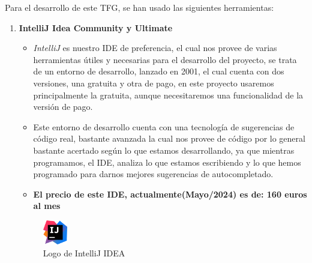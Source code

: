 \documentclass[a4paper]{article}
\begin{document}
Para el desarrollo de este TFG, se han usado las siguientes herramientas:
\begin{enumerate}
    \item \textbf{IntelliJ Idea Community y Ultimate}
          \begin{itemize}
              \item \textit{IntelliJ} es nuestro IDE de preferencia, el cual nos provee de varias herramientas útiles y necesarias para el desarrollo del proyecto, se trata de un entorno de desarrollo, lanzado en 2001, el cual cuenta con dos versiones, una gratuita y otra de pago, en este proyecto usaremos principalmente la gratuita, aunque necesitaremos una funcionalidad de la versión de pago.
              \item Este entorno de desarrollo cuenta con una tecnología de sugerencias de código real, bastante avanzada la cual nos provee de código por lo general bastante acertado según lo que estamos desarrollando, ya que mientras programamos, el IDE, analiza lo que estamos escribiendo y lo que hemos programado para darnos mejores sugerencias de autocompletado.
              \item \textbf{El precio de este IDE, actualmente(Mayo/2024) es de: 160 euros al mes}
          \end{itemize}
          \begin{figure}[h]
            \centering
            \includegraphics[width=0.1\textwidth]{Images/IntelliJ_IDEA_Icon.svg.png} %
            \caption{Logo de IntelliJ IDEA}
            \label{fig:intellij}
        \end{figure}
        

\end{enumerate}
\end{document}
